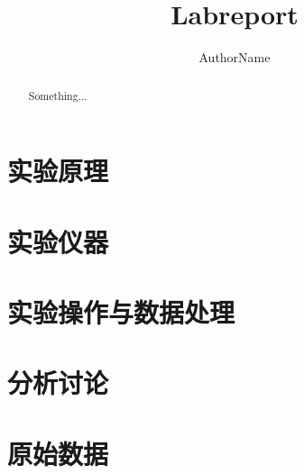\documentclass[UTF-8]{ctexart}
\title{Labreport}
\author{AuthorName}
\begin{document}
\maketitle
\tableofcontents
\begin{abstract}
	Something...
\end{abstract}

\section{实验原理}

\section{实验仪器}
\section{实验操作与数据处理}

\section{分析讨论}

\section*{原始数据}
\end{document}
